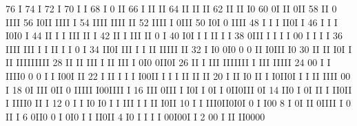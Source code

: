 \begin{Listing}
       76                                    I
       74                                    I
       72                                    I
       70                                    I  I
       68                                I   0 II
       66                                I  II II
       64                                II II II
       62                                II II I0
       60                                0I II 0II
       58                                II 0 IIII
       56                                I0II IIII I
       54                                IIII IIII II
       52                                IIII I  0III
       50                                 I0I 0  IIII
       48                             I    I  I  II0I                                I
       46                             I    I  I  I0I0                                I
       44                            II    I  I   III                             II I
       42                            II    I      III                             II 0   I
       40                            I0I          I I                             II I   I
       38                            0III            I I                 I      I 00 I I I    I
       36                            IIII            III                 I      I II I I 0    I
       34                            II0I            III                 I      I II  IIIII  II
       32                            I I0            0I0                 0      0 II  I0III  I0
       30                          II  II            I0I                 I     II     IIIIIIIII
       28                          II  II            III                 I  II III  I 0I0 0II0I
       26                          II   I            III                   IIIIIII  I III IIIII
       24                          00                    I          I      IIII0 0  0 I I I00I      II
       22                        I II                    I          I   I  I00II I  I   I  II   II  II
       20                        I II                   I0          II  I I0II0I I  I      II  IIII 00 I
       18                        0I                     III         0II 0 IIIII                I00IIII I
       16                       III                     0III  I     I0I I 0I  I                0II0III 0I
       14                       II0                     I 0I II I   II0II I                    IIII0   II I
       12                       0 I                     I I0 I0 I I  III  I                    I  II   I0II
       10                     I I                         III0II0I0I   0                              I I00
        8                   I 0I                            II 0IIII   I                              0  II  I
        6                   0II0                            0  I 0I0                                  I  I II0II
        4                   I0 I                            I    I I                                       00I00I I
        2                 00 I                                                                             II II0000
 

\end{Listing}
